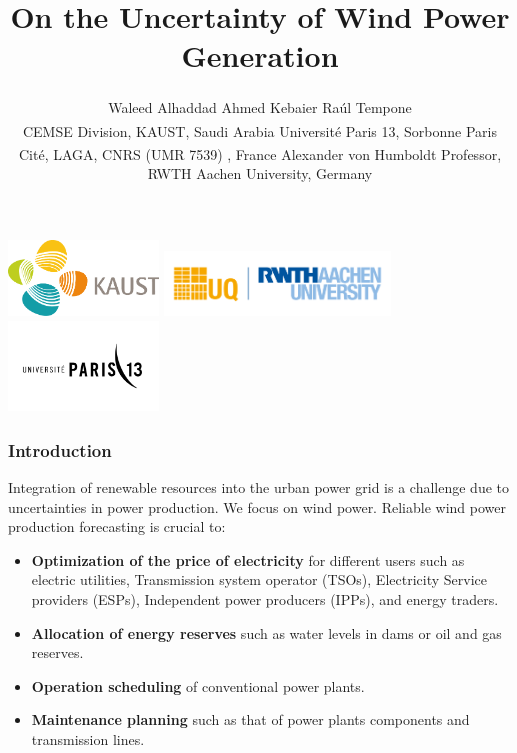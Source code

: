 \documentclass[aspectratio=169]{beamer}\usepackage[utf8]{inputenc}
\title{On the Uncertainty of Wind Power Generation}
\author{ Waleed Alhaddad\textsuperscript{\textasteriskcentered} \qquad Ahmed Kebaier\textsuperscript{\ddag} \qquad Ra\'ul  Tempone\textsuperscript{\textasteriskcentered}\textsuperscript{\textdagger} \\  \vskip 0.2in
\textsuperscript{\textasteriskcentered}CEMSE Division, KAUST, Saudi Arabia \vskip 0.05in  \textsuperscript{\ddag}Université Paris 13, Sorbonne Paris Cité, LAGA, CNRS (UMR 7539) , France\vskip 0.05in  
 \textsuperscript{\textdagger}Alexander von Humboldt Professor, RWTH Aachen  University,  Germany}
\begin{document}
\date{}

\begin{frame}
\titlepage
\center
  \includegraphics[width=40mm,scale=1]{KAUST_Logo.pdf}\quad 
  \includegraphics[width=60mm,scale=1]{rwth_UQ.png}\quad 
  \includegraphics[width=40mm,scale=1]{UParis_13.png} \quad
\end{frame}

\begin{frame}[label=guide]\frametitle{ Introduction }
Integration of renewable resources into the urban power grid is a challenge due to uncertainties in power production. We focus on wind power. Reliable wind power production forecasting is crucial to:
\begin{itemize}
\item \textbf{Optimization of the price of electricity} for different users such as electric utilities, Transmission system operator (TSOs), Electricity Service providers (ESPs), Independent power producers (IPPs), and energy traders.
\item \textbf{Allocation of energy reserves} such as water levels in dams or oil and gas reserves.
\item \textbf{Operation scheduling} of conventional power plants.
\item \textbf{Maintenance planning} such as that of power plants components and transmission lines.
\end{itemize}

\end{frame}
\end{document}
